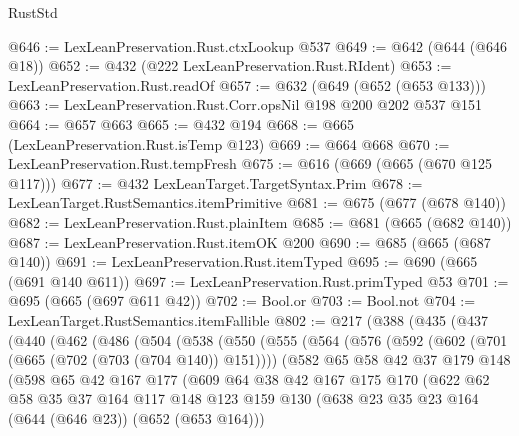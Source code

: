 \begin{lexlean}{RustStd}
\begin{coremodule}
{\begin{coremodule}
{{{{{@646 := LexLeanPreservation.Rust.ctxLookup @537
@649 := @642 (@644 (@646 @18))
@652 := @432 (@222 LexLeanPreservation.Rust.RIdent)
@653 := LexLeanPreservation.Rust.readOf
@657 := @632 (@649 (@652 (@653 @133)))
@663 := LexLeanPreservation.Rust.Corr.opsNil @198 @200 @202 @537 @151
@664 := @657 @663
@665 := @432 @194
@668 := @665 (LexLeanPreservation.Rust.isTemp @123)
@669 := @664 @668
@670 := LexLeanPreservation.Rust.tempFresh
@675 := @616 (@669 (@665 (@670 @125 @117)))
@677 := @432 LexLeanTarget.TargetSyntax.Prim
@678 := LexLeanTarget.RustSemantics.itemPrimitive
@681 := @675 (@677 (@678 @140))
@682 := LexLeanPreservation.Rust.plainItem
@685 := @681 (@665 (@682 @140))
@687 := LexLeanPreservation.Rust.itemOK @200
@690 := @685 (@665 (@687 @140))
@691 := LexLeanPreservation.Rust.itemTyped
@695 := @690 (@665 (@691 @140 @611))
@697 := LexLeanPreservation.Rust.primTyped @53
@701 := @695 (@665 (@697 @611 @42))
@702 := Bool.or
@703 := Bool.not
@704 := LexLeanTarget.RustSemantics.itemFallible
@802 := @217
    (@388
      (@435
        (@437
          (@440
            (@462
              (@486
                (@504
                  (@538
                    (@550
                      (@555
                        (@564
                          (@576
                            (@592
                              (@602 (@701 (@665 (@702 (@703 (@704 @140)) @151))))
                              (@582
                                @65
                                @58
                                @42
                                @37
                                @179
                                @148
                                (@598
                                  @65
                                  @42
                                  @167
                                  @177
                                  (@609
                                    @64
                                    @38
                                    @42
                                    @167
                                    @175
                                    @170
                                    (@622
                                      @62
                                      @58
                                      @35
                                      @37
                                      @164
                                      @117
                                      @148
                                      @123
                                      @159
                                      @130
                                      (@638 @23 @35 @23 @164 (@644 (@646 @23)) (@652 (@653 @164)))
}}}}}
\end{coremodule}}
\end{coremodule}
\end{lexlean}
